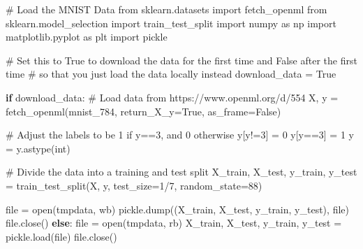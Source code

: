 \documentclass[
  letterpaper,
  DIV=11,
  numbers=noendperiod]{scrartcl}
\newenvironment{Shaded}{\begin{snugshade}}{\end{snugshade}}
\newcommand{\BuiltInTok}[1]{\textcolor[rgb]{0.00,0.23,0.31}{#1}}
\newcommand{\CommentTok}[1]{\textcolor[rgb]{0.37,0.37,0.37}{#1}}
\newcommand{\ControlFlowTok}[1]{\textcolor[rgb]{0.00,0.23,0.31}{\textbf{#1}}}
\newcommand{\DecValTok}[1]{\textcolor[rgb]{0.68,0.00,0.00}{#1}}
\newcommand{\ImportTok}[1]{\textcolor[rgb]{0.00,0.46,0.62}{#1}}
\newcommand{\NormalTok}[1]{\textcolor[rgb]{0.00,0.23,0.31}{#1}}
\newcommand{\OperatorTok}[1]{\textcolor[rgb]{0.37,0.37,0.37}{#1}}
\newcommand{\StringTok}[1]{\textcolor[rgb]{0.13,0.47,0.30}{#1}}
\newcommand{\VariableTok}[1]{\textcolor[rgb]{0.07,0.07,0.07}{#1}}
\begin{document}
\begin{Shaded}
\begin{Highlighting}[]
\CommentTok{\# Load the MNIST Data}
\ImportTok{from}\NormalTok{ sklearn.datasets }\ImportTok{import}\NormalTok{ fetch\_openml}
\ImportTok{from}\NormalTok{ sklearn.model\_selection }\ImportTok{import}\NormalTok{ train\_test\_split}
\ImportTok{import}\NormalTok{ numpy }\ImportTok{as}\NormalTok{ np}
\ImportTok{import}\NormalTok{ matplotlib.pyplot }\ImportTok{as}\NormalTok{ plt}
\ImportTok{import}\NormalTok{ pickle}

\CommentTok{\# Set this to True to download the data for the first time and False after the first time }
\CommentTok{\#   so that you just load the data locally instead}
\NormalTok{download\_data }\OperatorTok{=} \VariableTok{True}

\ControlFlowTok{if}\NormalTok{ download\_data:}
    \CommentTok{\# Load data from https://www.openml.org/d/554}
\NormalTok{    X, y }\OperatorTok{=}\NormalTok{ fetch\_openml(}\StringTok{\textquotesingle{}mnist\_784\textquotesingle{}}\NormalTok{, return\_X\_y}\OperatorTok{=}\VariableTok{True}\NormalTok{, as\_frame}\OperatorTok{=}\VariableTok{False}\NormalTok{)}
    
    \CommentTok{\# Adjust the labels to be \textquotesingle{}1\textquotesingle{} if y==3, and \textquotesingle{}0\textquotesingle{} otherwise}
\NormalTok{    y[y}\OperatorTok{!=}\StringTok{\textquotesingle{}3\textquotesingle{}}\NormalTok{] }\OperatorTok{=} \DecValTok{0}
\NormalTok{    y[y}\OperatorTok{==}\StringTok{\textquotesingle{}3\textquotesingle{}}\NormalTok{] }\OperatorTok{=} \DecValTok{1}
\NormalTok{    y }\OperatorTok{=}\NormalTok{ y.astype(}\StringTok{\textquotesingle{}int\textquotesingle{}}\NormalTok{)}
    
    \CommentTok{\# Divide the data into a training and test split}
\NormalTok{    X\_train, X\_test, y\_train, y\_test }\OperatorTok{=}\NormalTok{ train\_test\_split(X, y, test\_size}\OperatorTok{=}\DecValTok{1}\OperatorTok{/}\DecValTok{7}\NormalTok{, random\_state}\OperatorTok{=}\DecValTok{88}\NormalTok{)}
    
    \BuiltInTok{file} \OperatorTok{=} \BuiltInTok{open}\NormalTok{(}\StringTok{\textquotesingle{}tmpdata\textquotesingle{}}\NormalTok{, }\StringTok{\textquotesingle{}wb\textquotesingle{}}\NormalTok{)}
\NormalTok{    pickle.dump((X\_train, X\_test, y\_train, y\_test), }\BuiltInTok{file}\NormalTok{)}
    \BuiltInTok{file}\NormalTok{.close()}
\ControlFlowTok{else}\NormalTok{:}
    \BuiltInTok{file} \OperatorTok{=} \BuiltInTok{open}\NormalTok{(}\StringTok{\textquotesingle{}tmpdata\textquotesingle{}}\NormalTok{, }\StringTok{\textquotesingle{}rb\textquotesingle{}}\NormalTok{)}
\NormalTok{    X\_train, X\_test, y\_train, y\_test }\OperatorTok{=}\NormalTok{ pickle.load(}\BuiltInTok{file}\NormalTok{)}
    \BuiltInTok{file}\NormalTok{.close()}
\end{Highlighting}
\end{Shaded}
\end{document}
